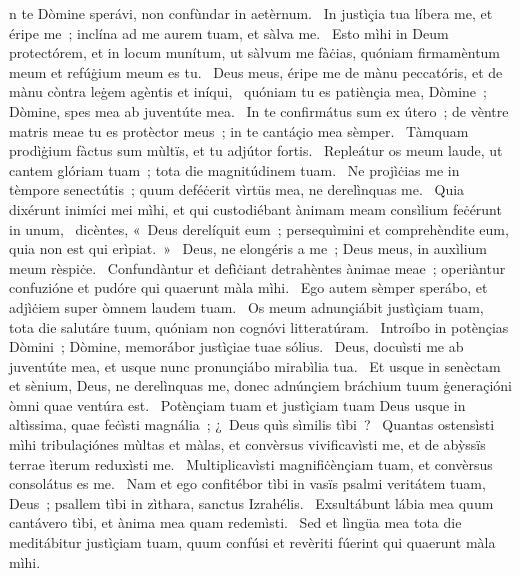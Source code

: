 \psalmChapterWithInscription{}
{ }
{%
n te Dòmine sperávi, non confùndar in aetèrnum. 
~In justìçia tua líbera me, et éripe me~; inclína ad me aurem tuam, et sàlva me. 
~Esto mìhi in Deum protectórem, et in locum munítum, ut sàlvum me fàċias, quóniam firmamèntum meum et refúġium meum es tu. 
~Deus meus, éripe me de mànu peccatóris, et de mànu còntra leġem agèntis et iníqui, 
~quóniam tu es patiènçia mea, Dòmine~; Dòmine, spes mea ab juventúte mea. 
~In te confirmátus sum ex útero~; de vèntre matris meae tu es protèctor meus~; in te cantáçio mea sèmper. 
~Tàmquam prodìġium fàctus sum mùltïs, et tu adjútor fortis. 
~Repleátur os meum laude, ut cantem glóriam tuam~; tota die magnitúdinem tuam. 
~Ne projìċias me in tèmpore senectútis~; quum deféċerit vìrtüs mea, ne derelìnquas me. 
~Quia dixérunt inimíci mei mìhi, et qui custodiébant ànimam meam consìlium feċérunt in unum, 
~dicèntes, «~Deus derelíquit eum~; persequìmini et comprehèndite eum, quia non est qui erìpiat.~»
~Deus, ne elongéris a me~; Deus meus, in auxìlium meum rèspiċe. 
~Confundàntur et defìċiant detrahèntes ànimae meae~; operiàntur confuzióne et pudóre qui quaerunt màla mìhi. 
~Ego autem sèmper sperábo, et adjìċiem super òmnem laudem tuam. 
~Os meum adnunçiábit justìçiam tuam, tota die salutáre tuum, quóniam non cognóvi litteratúram. 
~Introíbo in potènçias Dòmini~; Dòmine, memorábor justìçiae tuae sólius. 
~Deus, docuìsti me ab juventúte mea, et usque nunc pronunçiábo mirabìlia tua. 
~Et usque in senèctam et sènium, Deus, ne derelìnquas me, donec adnúnçiem bráchium tuum ġeneraçióni òmni quae ventúra est. 
~Potènçiam tuam et justìçiam tuam Deus usque in altìssima, quae feċìsti magnália~; ¿~Deus quìs sìmilis tìbi~? 
~Quantas ostensìsti mìhi tribulaçiónes mùltas et màlas, et convèrsus vivificavìsti me, et de abỳssïs terrae ìterum reduxìsti me. 
~Multiplicavìsti magnifiċènçiam tuam, et convèrsus consolátus es me. 
~Nam et ego confitébor tìbi in vasïs psalmi veritátem tuam, Deus~; psallem tìbi in zìthara, sanctus Izrahélis. 
~Exsultábunt lábia mea quum cantávero tìbi, et ànima mea quam redemìsti. 
~Sed et lìngüa mea tota die meditábitur justìçiam tuam, quum confúsi et revèriti fúerint qui quaerunt màla mìhi. 
}
